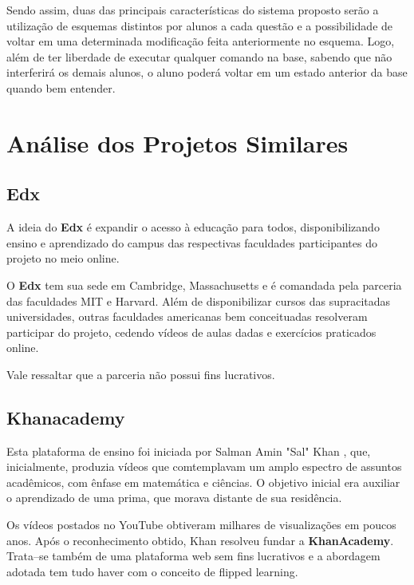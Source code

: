 \documentclass[graduacao,brazil]{ThesisPUC}
\begin{document}
Sendo assim, duas das principais caracter\'{i}sticas do sistema proposto ser\~{a}o a utiliza\c{c}\~{a}o de
esquemas distintos por alunos a cada quest\~{a}o e a possibilidade de voltar em uma determinada
modifica\c{c}\~{a}o feita anteriormente no esquema. Logo, al\'{e}m de ter liberdade de executar qualquer
comando na base, sabendo que n\~{a}o interferir\'{a} os demais alunos, o aluno poder\'{a} voltar em um
estado anterior da base quando bem entender.


\section{An\'{a}lise dos Projetos Similares}

\subsection{Edx}

A ideia do \textbf{Edx} \'{e} expandir o acesso \`{a} educa\c{c}\~{a}o para todos,
disponibilizando ensino e aprendizado do campus das respectivas faculdades participantes
do projeto no meio online.

O \textbf{Edx} tem sua sede em Cambridge, Massachusetts e \'{e} comandada pela parceria
das faculdades MIT e Harvard. Al\'{e}m de disponibilizar cursos das supracitadas universidades,
outras faculdades americanas bem conceituadas resolveram participar do projeto, cedendo v\'{i}deos
de aulas dadas e exerc\'{i}cios praticados online.

Vale ressaltar que a parceria n\~{a}o possui fins lucrativos.

\subsection{Khanacademy}

Esta plataforma de ensino foi iniciada por Salman Amin "Sal" Khan \cite{SalmanKhan}, que, inicialmente,
produzia v\'{i}deos que comtemplavam um amplo espectro de assuntos acad\^{e}micos, com \^{e}nfase em 
matem\'{a}tica e ci\^{e}ncias. O objetivo inicial era auxiliar o aprendizado de uma prima, que morava
distante de sua resid\^{e}ncia.

Os v\'{i}deos postados no YouTube obtiveram milhares de visualiza\c{c}\~{o}es em poucos anos. Ap\'{o}s o
reconhecimento obtido, Khan resolveu fundar a \textbf{KhanAcademy}. Trata--se tamb\'{e}m de uma plataforma 
web sem fins lucrativos e a abordagem adotada tem tudo haver com o conceito de flipped learning.
\end{document}
